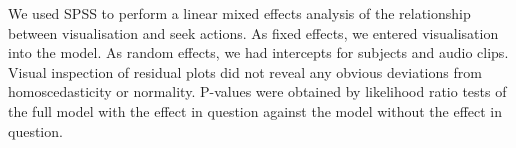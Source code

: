 We used SPSS to perform a linear mixed effects analysis of the relationship between visualisation and seek actions. As
fixed effects, we entered visualisation into the model. As random effects, we had intercepts for subjects and audio
clips. Visual inspection of residual plots did not reveal any obvious deviations from homoscedasticity or normality.
P-values were obtained by likelihood ratio tests of the full model with the effect in question against the model
without the effect in question.





